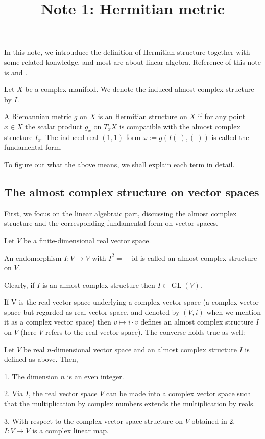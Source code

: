 \documentclass{ctexart}
\title{Note 1: Hermitian metric}
\date{} %
\begin{document}
\maketitle

In this note, we introuduce the definition of Hermitian structure together with some related konwledge, and most are about linear algebra.
Reference of this note is \cite{Huybrechts2005} and \cite{Kobayashi1996}. 

Let $X$ be a complex manifold. We denote the induced almost complex structure by $I$. 
\begin{definition}
    A Riemannian metric $g$ on $X$ is an Hermitian structure on $X$ if for any point $x \in X$ the scalar product $g_{x}$ on $T_{x} X$ is compatible with the almost complex structure $I_{x}$. 
    The induced real $(1,1)$-form $\omega:=g(I(\ ),(\ ))$ is called the fundamental form.
\end{definition}

To figure out what the above means, we shall explain each term in detail. 

\subsection*{The almost complex structure on vector spaces}

First, we focus on the linear algebraic part, discussing the almost complex structure and the corresponding 
fundamental form on vector spaces. 

Let $V$ be a finite-dimensional real vector space.
\begin{definition}
    An endomorphism $I: V \rightarrow V$ with $I^{2}=-$ id is called an almost complex structure on $V$.
\end{definition}
Clearly, if $I$ is an almost complex structure then $I \in \operatorname{GL}(V)$. 

If V is the real vector space underlying a complex vector space (a complex vector space but regarded as real vector space, and denoted by $(V,i)$ when we mention it as a complex vector space) 
then $v \mapsto i \cdot v$ defines an almost complex structure $I$ on $V$ (here $V$ refers to the real vector space). The converse holds true as well:
\begin{lemma}
    Let $V$ be real $n$-dimensional vector space and an almost complex structure $I$ is defined as above. Then,

    1. The dimension $n$ is an even integer.

    2. Via $I$, the real vector space $V$ can be made into a complex vector space such that the multiplication by complex numbers extends the multiplication by reals.

    3. With respect to the complex vector space structure on $V$ obtained in 2, $I: V \rightarrow V$ is a complex linear map.
\end{lemma}
\end{document}

